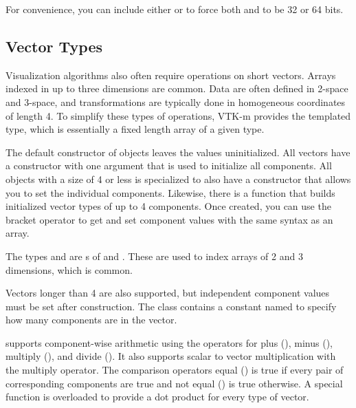 For convenience, you can include either
 or
 to force both  and
 to be 32 or 64 bits.

\subsection{Vector Types}
\label{sec:VectorTypes}

Visualization algorithms also often require operations on short vectors.
Arrays indexed in up to three dimensions are common. Data are often defined
in 2-space and 3-space, and transformations are typically done in
homogeneous coordinates of length 4. To simplify these types of operations,
VTK-m provides the  templated type, which is
essentially a fixed length array of a given type.

The default constructor of  objects leaves the values
uninitialized. All vectors have a constructor with one argument that is
used to initialize all components. All  objects with a size of 4
or less is specialized to also have a constructor that allows you to set
the individual components. Likewise, there is a  function
that builds initialized vector types of up to 4 components. Once created,
you can use the bracket operator to get and set component values with the
same syntax as an array.


The types  and  are s of
 and . These
are used to index arrays of 2 and 3 dimensions, which is common.

Vectors longer than 4 are also supported, but independent component values
must be set after construction. The  class contains a constant
named  to specify how many
components are in the vector.


 supports component-wise arithmetic using the operators
for plus (\textcode{+}), minus (\textcode{-}), multiply (\textcode{*}), and
divide (\textcode{/}). It also supports scalar to vector multiplication
with the multiply operator. The comparison operators equal (\textcode{==})
is true if every pair of corresponding components are true and not equal
(\textcode{!=}) is true otherwise. A special  function is
overloaded to provide a dot product for every type of vector.


